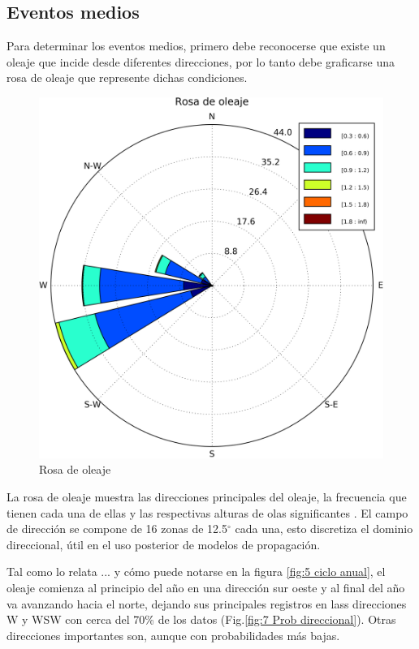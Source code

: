 \documentclass[5p,times,authoryear]{elsarticle}
\begin{document}
\subsection{Eventos medios}
Para determinar los eventos medios, primero debe reconocerse que existe un oleaje que incide desde diferentes direcciones, por lo tanto debe graficarse una rosa de oleaje que represente dichas condiciones.

\begin{figure}[h]
    \centering
    \includegraphics[scale=0.35]{Graficas/rosa_oleaje}
    \caption{Rosa de oleaje}
    \label{fig:6 Rosa de oleaje}
\end{figure}

La rosa de oleaje muestra las direcciones principales del oleaje, la frecuencia que tienen cada una de ellas y las respectivas alturas de olas significantes . El campo de dirección se compone de 16 zonas de 12.5$^\circ$ cada una, esto  discretiza el dominio direccional, útil en el uso posterior de modelos de propagación.

Tal como lo relata ...  y cómo puede notarse en la figura \ref{fig:5 ciclo anual}, el oleaje comienza al principio del año en una dirección sur oeste y al final del año va avanzando hacia el norte, dejando sus principales registros en lass direcciones W y WSW con cerca del 70\% de los datos (Fig.\ref{fig:7 Prob direccional}). Otras direcciones importantes son, aunque con probabilidades más bajas.
\end{document}
